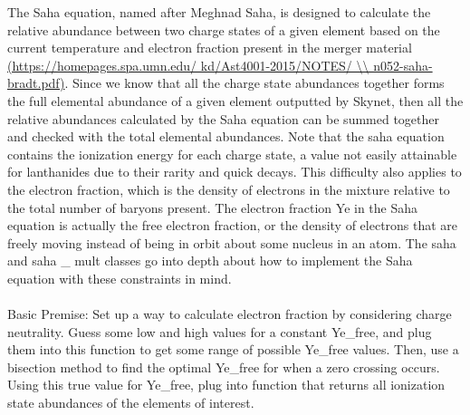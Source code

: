\documentclass[11pt,a4paper]{article}
\begin{document}
The Saha equation, named after Meghnad Saha, is designed to calculate the relative abundance between two charge states of a given element based on the current temperature and electron fraction present in the merger material \url{(https://homepages.spa.umn.edu/ kd/Ast4001-2015/NOTES/ \\ n052-saha-bradt.pdf)}. Since we know that all the charge state abundances together forms the full elemental abundance of a given element outputted by Skynet, then all the relative abundances calculated by the Saha equation can be summed together and checked with the total elemental abundances. Note that the saha equation contains the ionization energy for each charge state, a value not easily attainable for lanthanides due to their rarity and quick decays. This difficulty also applies to the electron fraction, which is the density of electrons in the mixture relative to the total number of baryons present. The electron fraction Ye in the Saha equation is actually the free electron fraction, or the density of electrons that are freely moving instead of being in orbit about some nucleus in an atom. The saha and saha \_ mult classes go into depth about how to implement the Saha equation with these constraints in mind.  \\


\\
Basic Premise: Set up a way to calculate electron fraction by
considering charge neutrality. Guess some low and high values for a
constant Ye\_free, and plug them into this function to get some range
of possible Ye\_free values. Then, use a bisection method to find the
optimal Ye\_free for when a zero crossing occurs. Using this true
value for Ye\_free, plug into function that returns all ionization
state abundances of the elements of interest. 
\end{document}
